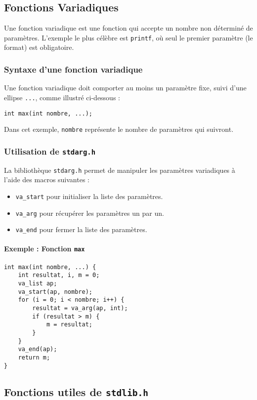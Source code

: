 \documentclass[french,11pt]{article}
\begin{document}
\subsection{Fonctions Variadiques}
Une fonction variadique est une fonction qui accepte un nombre non déterminé de paramètres. L'exemple le plus célèbre est \texttt{printf}, où seul le premier paramètre (le format) est obligatoire.

\subsubsection{Syntaxe d'une fonction variadique}
Une fonction variadique doit comporter au moins un paramètre fixe, suivi d'une ellipse \texttt{...}, comme illustré ci-dessous :
\begin{verbatim}
int max(int nombre, ...);
\end{verbatim}
Dans cet exemple, \texttt{nombre} représente le nombre de paramètres qui suivront. 

\subsubsection{Utilisation de \texttt{stdarg.h}}
La bibliothèque \texttt{stdarg.h} permet de manipuler les paramètres variadiques à l'aide des macros suivantes :
\begin{itemize}
    \item \texttt{va\_start} pour initialiser la liste des paramètres.
    \item \texttt{va\_arg} pour récupérer les paramètres un par un.
    \item \texttt{va\_end} pour fermer la liste des paramètres.
\end{itemize}

\paragraph{Exemple : Fonction \texttt{max}}
\begin{verbatim}
int max(int nombre, ...) {
    int resultat, i, m = 0;
    va_list ap;
    va_start(ap, nombre);
    for (i = 0; i < nombre; i++) {
        resultat = va_arg(ap, int);
        if (resultat > m) {
            m = resultat;
        }
    }
    va_end(ap);
    return m;
}
\end{verbatim}

\subsection{Fonctions utiles de \texttt{stdlib.h}}
\end{document}
